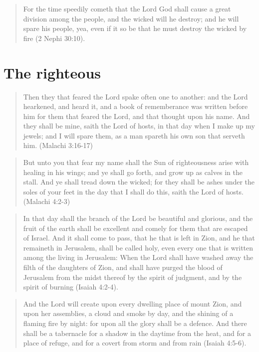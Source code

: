 \begin{quotation}
For the time speedily cometh that the Lord God shall cause a great division among the people, and the wicked will he destroy; and he will spare his people, yea, even if it so be that he must destroy the wicked by fire (2 Nephi 30:10).
\end{quotation}


\section{The righteous}

\begin{quotation}
Then they that feared the Lord spake often one to another: and the Lord hearkened, and heard it, and a book of rememberance was written before him for them that feared the Lord, and that thought upon his name. And they shall be mine, saith the Lord of hosts, in that day when I make up my jewels; and I will spare them, as a man spareth his own son that serveth him. (Malachi 3:16-17)
\end{quotation}

\begin{quotation}
But unto you that fear my name shall the Sun of righteousness arise with healing in his wings; and ye shall go forth, and grow up as calves in the stall. And ye shall tread down the wicked; for they shall be ashes under the soles of your feet in the day that I shall do this, saith the Lord of hosts. (Malachi 4:2-3)
\end{quotation}

\begin{quotation}
In that day shall the branch of the Lord be beautiful and glorious, and the fruit of the earth shall be excellent and comely for them that are escaped of Israel. And it shall come to pass, that he that is left in Zion, and he that remaineth in Jerusalem, shall be called holy, even every one that is written among the living in Jerusalem: When the Lord shall have washed away the filth of the daughters of Zion, and shall have purged the blood of Jerusalem from the midst thereof by the spirit of judgment, and by the spirit of burning (Isaiah 4:2-4).
\end{quotation}

\begin{quotation}
And the Lord will create upon every dwelling place of mount Zion, and upon her assemblies, a cloud and smoke by day, and the shining of a flaming fire by night: for upon all the glory shall be a defence. And there shall be a tabernacle for a shadow in the daytime from the heat, and for a place of refuge, and for a covert from storm and from rain (Isaiah 4:5-6).
\end{quotation}


